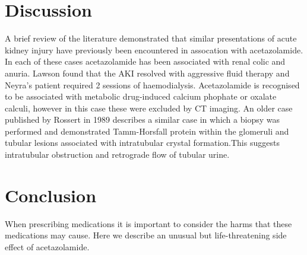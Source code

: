 \documentclass[11pt, ]{article}
\begin{document}
\section*{Discussion}
A brief review of the literature demonstrated that similar presentations of acute kidney injury have previously been encountered in assocation with acetazolamide\cite{Neyra2014, Rossert1984, Lawson2020}. In each of these cases acetazolamide has been associated with renal colic and anuria. Lawson found that the AKI resolved with aggressive fluid therapy and Neyra's patient required 2 sessions of haemodialysis. Acetazolamide is recognised to be associated with metabolic drug-induced calcium phophate or oxalate calculi, however in this case these were excluded by CT imaging. An older case published by Rossert in 1989 describes a similar case in which a biopsy was performed and demonstrated Tamm-Horsfall protein within the glomeruli and tubular lesions associated with intratubular crystal formation.This suggests intratubular obstruction and retrograde flow of tubular urine\cite{Rossert1984}.  

\section*{Conclusion}
When prescribing medications it is important to consider the harms that these medications may cause. Here we describe an unusual but life-threatening side effect of acetazolamide. 


\printbibliography
\end{document}
